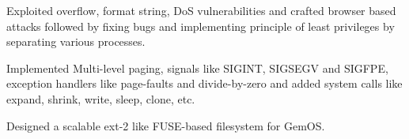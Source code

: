 \documentclass[]{deedy-resume-reversed}
\begin{document}
\begin{minipage}[t]{0.60\textwidth}
\descript{}
\begin{tightemize}
    \item Exploited overflow, format string, DoS vulnerabilities and crafted browser based attacks followed by fixing bugs and implementing principle of least privileges by separating various processes.
\end{tightemize}
\sectionsep

\begin{tightemize}
    \item Implemented Multi-level paging, signals like SIGINT, SIGSEGV and SIGFPE, exception handlers like page-faults and divide-by-zero and added system calls like expand, shrink, write, sleep, clone, etc.
    \item Designed a scalable ext-2 like FUSE-based filesystem for GemOS.
\end{tightemize}
\sectionsep





\end{minipage}
\end{document}
